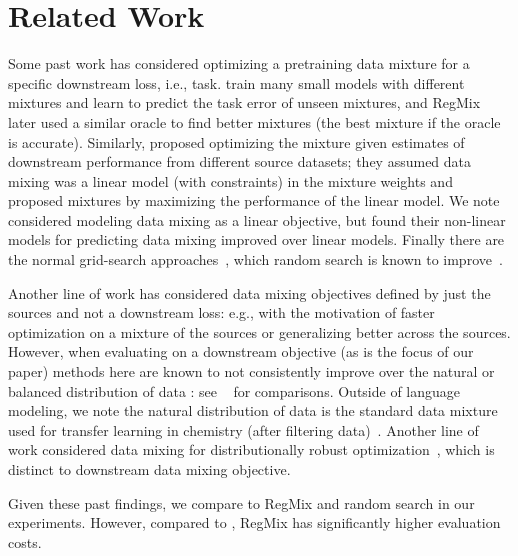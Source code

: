 \section{Related Work}

Some past work has considered optimizing a pretraining data mixture for a specific downstream loss, i.e., task. \citet{hwang2021regmix} train many small models with different mixtures and learn to predict the task error of unseen mixtures, and RegMix ~\citep{liu2024regmix} later used a similar oracle to find better mixtures (the best mixture if the oracle is accurate). %
Similarly, \citet{held2025optimizing} proposed optimizing the mixture given estimates of downstream performance from different source datasets; they assumed data mixing was a linear model (with constraints) in the mixture weights and proposed mixtures by maximizing the performance of the linear model. We note~\citet{liu2024regmix} considered modeling data mixing as a linear objective, but found their non-linear models for predicting data mixing improved over linear models. Finally there are the normal grid-search approaches~\citep{blakeney2024does}, which random search is known to improve~\citep{bergstra2012random}. 



Another line of work has considered data mixing objectives defined by just the sources and not a downstream loss: e.g., with the motivation of faster optimization on a mixture of the sources or generalizing better across the sources. However, when evaluating on a downstream objective (as is the focus of our paper) methods here are known to not consistently improve over the natural or balanced distribution of data \citep{fan2023doge,jiang2024adaptive, albalak2023efficient, xie2024doremi}: see ~\citet{held2025optimizing} for comparisons. Outside of language modeling, we note the natural distribution of data is the standard data mixture used for transfer learning in chemistry (after filtering data)~\citep{salem2020transcreen,li2022improving, ye2018integrated}. Another line of work considered data mixing for distributionally robust optimization~\citep{thudi2024finding}, which is distinct to downstream data mixing objective. 


Given these past findings, we compare to RegMix and random search in our experiments. However, compared to \methodnospace, RegMix has significantly higher evaluation costs.



